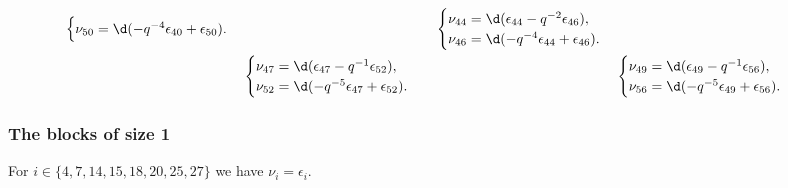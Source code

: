 \begin{align*}
\begin{cases}
\nu_{50} = \d(-q^{-4}\epsilon_{40} + \epsilon_{50}).
\end{cases}
&&\begin{cases}
\nu_{44} = \d(\epsilon_{44} - q^{-2}\epsilon_{46}),\\
\nu_{46} = \d(-q^{-4}\epsilon_{44} + \epsilon_{46}).
\end{cases}
\\
&\begin{cases}
\nu_{47} = \d(\epsilon_{47} - q^{-1}\epsilon_{52}),\\
\nu_{52} = \d(-q^{-5}\epsilon_{47} + \epsilon_{52}).
\end{cases}
&&\begin{cases}
\nu_{49} = \d(\epsilon_{49} - q^{-1}\epsilon_{56}),\\
\nu_{56} = \d(-q^{-5}\epsilon_{49} + \epsilon_{56}).
\end{cases}
\end{align*}

\subsubsection{The blocks of size 1}
For $i\in\{4, 7, 14, 15, 18, 20, 25, 27\}$ we have $\nu_i=\epsilon_i$.

